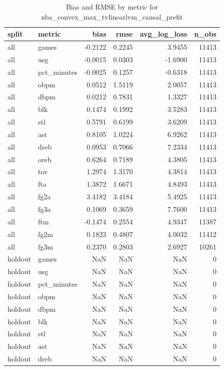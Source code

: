 \begin{table}
\caption{Bias and RMSE by metric for nba_convex_max_tvlinearlvm_causal_prefit}
\label{tab:nba_convex_max_tvlinearlvm_causal_prefit_bias_rmse}
\begin{tabular}{llrrrr}
\toprule
split & metric & bias & rmse & avg\_log\_loss & n\_obs \\
\midrule
all & games & -0.2122 & 0.2245 & 3.9455 & 11413 \\
all & usg & -0.0015 & 0.0303 & -1.6900 & 11413 \\
all & pct\_minutes & -0.0025 & 0.1257 & -0.6318 & 11413 \\
all & obpm & 0.0512 & 1.5119 & 2.0057 & 11413 \\
all & dbpm & 0.0212 & 0.7831 & 1.3327 & 11413 \\
all & blk & 0.1474 & 0.1992 & 3.5283 & 11413 \\
all & stl & 0.5791 & 0.6199 & 3.6209 & 11413 \\
all & ast & 0.8105 & 1.0224 & 6.9262 & 11413 \\
all & dreb & 0.0953 & 0.7066 & 7.2334 & 11413 \\
all & oreb & 0.6264 & 0.7189 & 4.3805 & 11413 \\
all & tov & 1.2974 & 1.3170 & 4.3814 & 11413 \\
all & fta & 1.3872 & 1.6671 & 4.8493 & 11413 \\
all & fg2a & 3.4182 & 3.4184 & 5.4925 & 11413 \\
all & fg3a & 0.1069 & 0.3659 & 7.7600 & 11413 \\
all & ftm & -0.1474 & 0.2554 & 4.9347 & 11387 \\
all & fg2m & 0.1823 & 0.4807 & 4.0032 & 11412 \\
all & fg3m & 0.2370 & 0.2803 & 2.6927 & 10261 \\
holdout & games & NaN & NaN & NaN & 0 \\
holdout & usg & NaN & NaN & NaN & 0 \\
holdout & pct\_minutes & NaN & NaN & NaN & 0 \\
holdout & obpm & NaN & NaN & NaN & 0 \\
holdout & dbpm & NaN & NaN & NaN & 0 \\
holdout & blk & NaN & NaN & NaN & 0 \\
holdout & stl & NaN & NaN & NaN & 0 \\
holdout & ast & NaN & NaN & NaN & 0 \\
holdout & dreb & NaN & NaN & NaN & 0 \\

\end{tabular}
\end{table}
